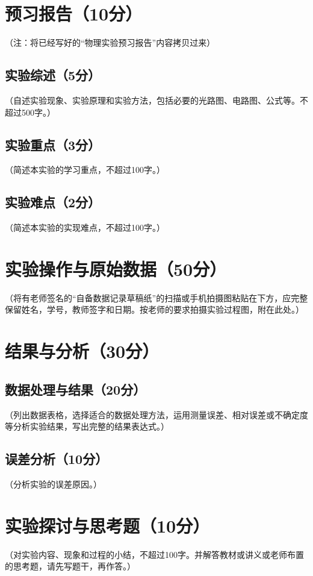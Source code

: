 \documentclass[10pt,a4paper]{ctexart} %
\begin{document}
\section{预习报告（10分）}
（注：将已经写好的“物理实验预习报告”内容拷贝过来）
  \subsection{实验综述（5分）}
  （自述实验现象、实验原理和实验方法，包括必要的光路图、电路图、公式等。不超过500字。）
  \subsection{实验重点（3分）}
  （简述本实验的学习重点，不超过100字。）
  \subsection{实验难点（2分）}
  （简述本实验的实现难点，不超过100字。）

\section{实验操作与原始数据（50分）}
（将有老师签名的“自备数据记录草稿纸”的扫描或手机拍摄图粘贴在下方，应完整保留姓名，学号，教师签字和日期。按老师的要求拍摄实验过程图，附在此处。）

\section{结果与分析（30分）}
  \subsection{数据处理与结果（20分）}  
  （列出数据表格，选择适合的数据处理方法，运用测量误差、相对误差或不确定度等分析实验结果，写出完整的结果表达式。）

  \subsection{误差分析（10分）}
  （分析实验的误差原因。）

\section{实验探讨与思考题（10分）}
（对实验内容、现象和过程的小结，不超过100字。并解答教材或讲义或老师布置的思考题，请先写题干，再作答。）
\end{document}
